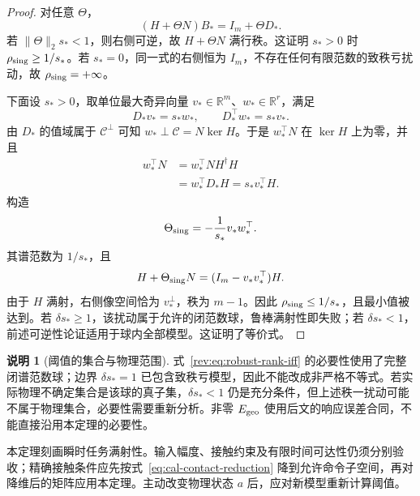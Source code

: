 \documentclass[11pt,a4paper]{article}
\numberwithin{equation}{section}
\theoremstyle{definition}
\newtheorem{remark}[theorem]{说明}
\begin{document}
\begin{proof}
对任意 $\Theta$，
\begin{equation}
 (H+\Theta N)B_*=I_m+\Theta D_* .
 \label{rev:eq:robust-right-product}
\end{equation}
若 $\|\Theta\|_2s_*<1$，则右侧可逆，故 $H+\Theta N$ 满行秩。这证明 $s_*>0$ 时 $\rho_{\rm sing}\ge1/s_*$。若 $s_*=0$，同一式的右侧恒为 $I_m$，不存在任何有限范数的致秩亏扰动，故 $\rho_{\rm sing}=+\infty$。

下面设 $s_*>0$，取单位最大奇异向量 $v_*\in\mathbb R^m$、$w_*\in\mathbb R^r$，满足
\begin{equation}
 D_*v_*=s_*w_*,
 \qquad
 D_*^\top w_*=s_*v_* .
 \label{rev:eq:worst-singular-pair}
\end{equation}
由 $D_*$ 的值域属于 $\mathcal C^\perp$ 可知 $w_*\perp\mathcal C=N\ker H$。于是 $w_*^\top N$ 在 $\ker H$ 上为零，并且
\begin{align}
 w_*^\top N
 &=w_*^\top NH^\dagger H\\
 &=w_*^\top D_*H
 =s_*v_*^\top H .
 \label{rev:eq:rank-loss-factor}
\end{align}
构造
\begin{equation}
 \Theta_{\rm sing}
 =-\frac1{s_*}v_*w_*^\top .
 \label{rev:eq:singular-witness}
\end{equation}
其谱范数为 $1/s_*$，且
\begin{equation}
 H+\Theta_{\rm sing}N
 =(I_m-v_*v_*^\top)H .
 \label{rev:eq:rank-deficient-response}
\end{equation}
由于 $H$ 满射，右侧像空间恰为 $v_*^\perp$，秩为 $m-1$。因此 $\rho_{\rm sing}\le1/s_*$，且最小值被达到。若 $\delta s_*\ge1$，该扰动属于允许的闭范数球，鲁棒满射性即失败；若 $\delta s_*<1$，前述可逆性论证适用于球内全部模型。这证明了等价式。
\end{proof}

\begin{remark}[阈值的集合与物理范围]
\label{rev:rem:rank-scope}
式~\eqref{rev:eq:robust-rank-iff} 的必要性使用了完整闭谱范数球；边界 $\delta s_*=1$ 已包含致秩亏模型，因此不能改成非严格不等式。若实际物理不确定集合是该球的真子集，$\delta s_*<1$ 仍是充分条件，但上述秩一扰动可能不属于物理集合，必要性需要重新分析。非零 $E_{\rm geo}$ 使用后文的响应误差合同，不能直接沿用本定理的必要性。

本定理刻画瞬时任务满射性。输入幅度、接触约束及有限时间可达性仍须分别验收；精确接触条件应先按式~\eqref{eq:cal-contact-reduction} 降到允许命令子空间，再对降维后的矩阵应用本定理。主动改变物理状态 $a$ 后，应对新模型重新计算阈值。
\end{remark}
\end{document}
